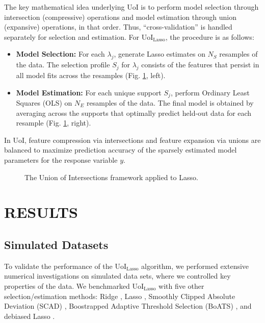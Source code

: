 \documentclass[letterpaper, 10 pt, conference]{ieeeconf}  %
\begin{document}
The key mathematical idea underlying UoI is to perform
model selection through intersection (compressive) operations and model estimation through union (expansive) operations, in that order. Thus, ``cross-validation'' is handled separately for selection and estimation. For UoI$_{\text{Lasso}}$, the procedure is as follows:
\begin{itemize}
    \item \textbf{Model Selection:} For each $\lambda_j$, generate Lasso estimates on $N_S$ resamples of the data. The selection profile $S_j$ for $\lambda_j$ consists of the features that persist in all model fits across the resamples (Fig. \ref{fig:uoi}, left).
    \item \textbf{Model Estimation:} For each unique support $S_j$, perform Ordinary Least Squares (OLS) on $N_E$ resamples of the data. The final model is obtained by averaging across the supports that optimally predict held-out data for each resample (Fig. \ref{fig:uoi}, right). 
\end{itemize}
In UoI, feature compression via intersections and feature expansion via unions are balanced to maximize prediction accuracy of the sparsely estimated model parameters for the response variable $y$.
\begin{figure}[b]
    \centering
    \caption{The Union of Intersections framework applied to Lasso.}
    \label{fig:uoi}
\end{figure}
\section{RESULTS}

\subsection{Simulated Datasets}
To validate the performance of the UoI$_{\text{Lasso}}$ algorithm, we performed extensive numerical investigations on simulated data sets, where we controlled key properties of the data. We benchmarked UoI$_{\text{Lasso}}$ with five other selection/estimation methods: Ridge \cite{elements}, Lasso \cite{lasso}, Smoothly Clipped Absolute Deviation (SCAD) \cite{scad}, Boostrapped Adaptive Threshold Selection (BoATS) \cite{boats}, and debiased Lasso \cite{dbLasso}. 
\end{document}
